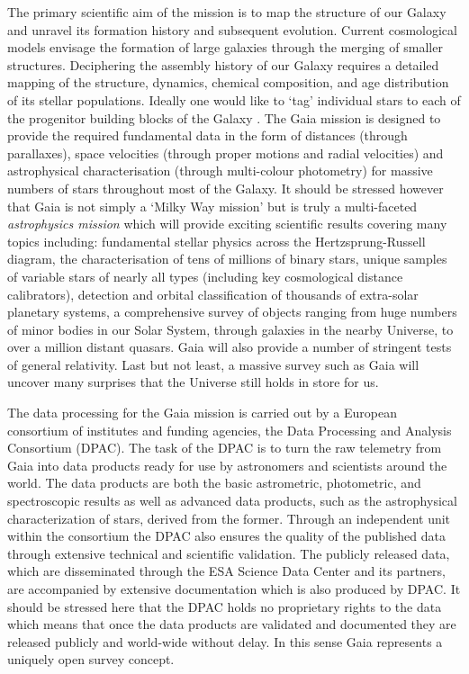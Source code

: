The primary scientific aim of the mission is to map the structure of our Galaxy and unravel its formation history and
subsequent evolution. Current cosmological models envisage the formation of large galaxies through the merging of
smaller structures. Deciphering the assembly history of our Galaxy requires a detailed mapping of the structure,
dynamics, chemical composition, and age distribution of its stellar populations. Ideally one would like to `tag'
individual stars to each of the progenitor building blocks of the Galaxy \cite{2002ARA&A..40..487F}. The Gaia mission is
designed to provide the required fundamental data in the form of distances (through parallaxes), space velocities
(through proper motions and radial velocities) and astrophysical characterisation (through multi-colour photometry) for
massive numbers of stars throughout most of the Galaxy. It should be stressed however that Gaia is not simply a `Milky
Way mission' but is truly a multi-faceted {\em astrophysics mission} which will provide exciting scientific results
covering many topics including: fundamental stellar physics across the Hertzsprung-Russell diagram, the characterisation of
tens of millions of binary stars, unique samples of variable stars of nearly all types (including key cosmological
distance calibrators), detection and orbital classification of thousands of extra-solar planetary systems, a
comprehensive survey of objects ranging from huge numbers of minor bodies in our Solar System, through galaxies in the
nearby Universe, to over a million distant quasars. Gaia will also provide a number of stringent tests of general
relativity. Last but not least, a massive survey such as Gaia will uncover many surprises that the Universe still holds
in store for us.

The data processing for the Gaia mission is carried out by a European consortium of institutes and funding agencies, the Data Processing and Analysis Consortium (DPAC). The task of the DPAC is to turn the raw telemetry from Gaia into data products ready for use by astronomers and scientists around the world. The data products are both the basic astrometric, photometric, and spectroscopic results as well as advanced data products, such as the astrophysical characterization of stars, derived from the former. Through an independent unit within the consortium the DPAC also ensures the quality of the published data through extensive technical and scientific validation. The publicly released data, which are disseminated through the ESA Science Data Center and its partners,
are accompanied by extensive documentation which is also produced by DPAC. It should be stressed here that the DPAC holds no proprietary rights to the data which means that once the data products are validated and documented they are released publicly and world-wide without delay. In this sense Gaia represents a uniquely open survey concept.

